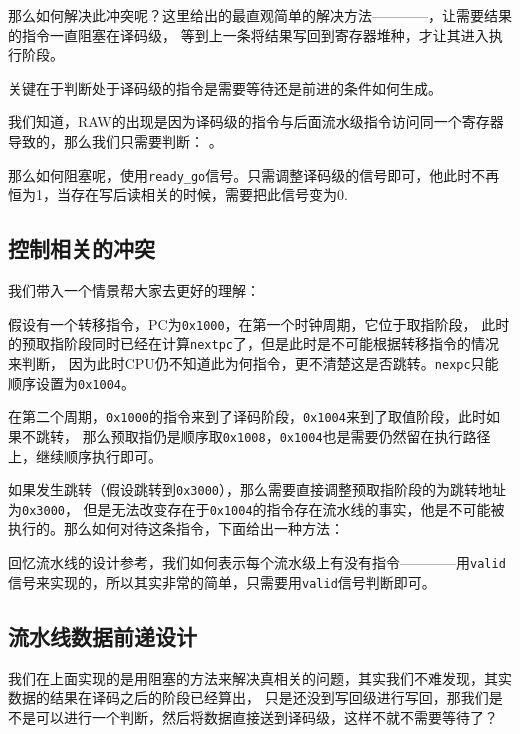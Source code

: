那么如何解决此冲突呢？这里给出的最直观简单的解决方法————，让需要结果的指令一直阻塞在译码级，
等到上一条将结果写回到寄存器堆种，才让其进入执行阶段。

关键在于判断处于译码级的指令是需要等待还是前进的条件如何生成。

我们知道，RAW的出现是因为译码级的指令与后面流水级指令访问同一个寄存器导致的，那么我们只需要判断：
。

那么如何阻塞呢，使用\texttt{ready\_go}信号。只需调整译码级的信号即可，他此时不再恒为1，当存在写后读相关的时候，需要把此信号变为0.

\subsection{控制相关的冲突}

我们带入一个情景帮大家去更好的理解：

假设有一个转移指令，PC为\texttt{0x1000}，在第一个时钟周期，它位于取指阶段，
此时的预取指阶段同时已经在计算\texttt{nextpc}了，但是此时是不可能根据转移指令的情况来判断，
因为此时CPU仍不知道此为何指令，更不清楚这是否跳转。\texttt{nexpc}只能顺序设置为\texttt{0x1004}。

在第二个周期，\texttt{0x1000}的指令来到了译码阶段，\texttt{0x1004}来到了取值阶段，此时如果不跳转，
那么预取指仍是顺序取\texttt{0x1008}，\texttt{0x1004}也是需要仍然留在执行路径上，继续顺序执行即可。

如果发生跳转（假设跳转到\texttt{0x3000}），那么需要直接调整预取指阶段的为跳转地址为\texttt{0x3000}，
但是无法改变存在于\texttt{0x1004}的指令存在流水线的事实，他是不可能被执行的。那么如何对待这条指令，下面给出一种方法：

回忆流水线的设计参考，我们如何表示每个流水级上有没有指令————用\texttt{valid}信号来实现的，所以其实非常的简单，只需要用\texttt{valid}信号判断即可。


\subsection{流水线数据前递设计}

我们在上面实现的是用阻塞的方法来解决真相关的问题，其实我们不难发现，其实数据的结果在译码之后的阶段已经算出，
只是还没到写回级进行写回，那我们是不是可以进行一个判断，然后将数据直接送到译码级，这样不就不需要等待了？

